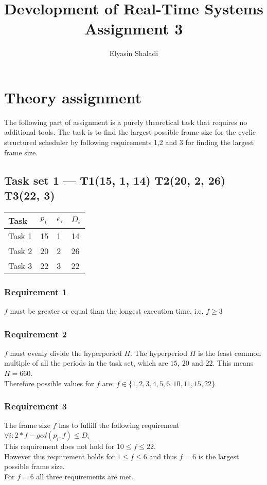 \documentclass{article}
\begin{document}
\title{
Development of Real-Time Systems\\
Assignment 3
}
\author{Elyasin Shaladi}
\maketitle

\tableofcontents

\section{Theory assignment}
The following part of assignment is a purely theoretical task that requires no additional tools.
The task is to find the largest possible frame size for the cyclic structured scheduler by
following requirements 1,2 and 3 for finding the largest frame size.

\subsection{Task set 1 --- T1(15, 1, 14) T2(20, 2, 26) T3(22, 3)}

\begin{tabular}{|l||l|l|l|}
\hline
Task   & $p_i$ & $e_i$ & $D_i$ \\
\hline
\hline
Task 1 & 15 & 1 & 14 \\
\hline
Task 2 & 20 & 2 & 26 \\
\hline
Task 3 & 22 & 3 & 22 \\
\hline
\end{tabular}

\subsubsection{Requirement 1}
$f$ must be greater or equal than the longest execution time, i.e. $f \geq 3$

\subsubsection{Requirement 2}
$f$ must evenly divide the hyperperiod $H$. The hyperperiod $H$ is the least common multiple of
all the periods in the task set, which are $15$, $20$ and $22$. This means $H = 660$. \\
Therefore possible values for $f$ are: $f \in \{1,2,3,4,5,6,10,11,15,22\}$

\subsubsection{Requirement 3}
The frame size $f$ has to fulfill the following requirement $\forall i: 2*f-gcd(p_i,f) \leq D_i$ \\
This requirement does not hold for $10 \leq f \leq 22$. \\
However this requirement holds for $1 \leq f \leq 6$ and thus $f = 6$ is the
largest possible frame size. \\
For $f = 6$ all three requirements are met.
\end{document}
